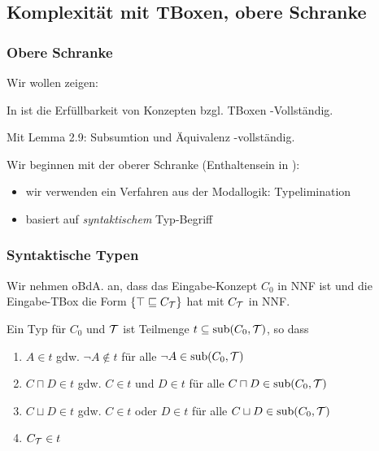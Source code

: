 \subsection{Komplexität mit TBoxen, obere
Schranke}\label{komplexituxe4t-mit-tboxen-obere-schranke}

\subsubsection{Obere Schranke}

Wir wollen zeigen:

\begin{theorem}
In \ALC ist die Erfüllbarkeit von Konzepten bzgl. TBoxen
\ExpTime-Vollständig.
\end{theorem}

Mit Lemma 2.9: Subsumtion und Äquivalenz \ExpTime-vollständig.

Wir beginnen mit der oberer Schranke (Enthaltensein in \ExpTime):

\begin{itemize}
  \item wir verwenden ein Verfahren aus der Modallogik: Typelimination
  \item basiert auf \emph{syntaktischem} Typ-Begriff
\end{itemize}

\subsubsection{Syntaktische Typen}\label{synt-typ}

Wir nehmen oBdA. an, dass das Eingabe-Konzept $C_0$ in NNF ist und die Eingabe-TBox die Form $\{\top \sqsubseteq C_{\mathcal{T}}\}$ hat mit $C_{\mathcal{T}}$ in NNF.

\begin{definition}[Typ]

Ein Typ für $C_{0}$ und $\mathcal{T}$ ist Teilmenge
$t \subseteq \sub\left( C_{0}, \MT \right)$, so dass

\begin{enumerate}
\item
  $A \in t$ gdw. $\neg A \notin t$ für alle
  $\neg A \in \sub\left( C_{0}, \MT \right)$
\item
  $C \sqcap D \in t$ gdw. $C \in t$ und $D \in t$ für alle
  $C \sqcap D \in \sub\left( C_{0}, \MT \right)$
\item
  $C \sqcup D \in t$ gdw. $C \in t$ oder $D \in t$ für alle
  $C \sqcup D \in \sub\left( C_{0}, \MT \right)$
\item
  $C_{\mathcal{T}} \in t$
\end{enumerate}
\end{definition}

